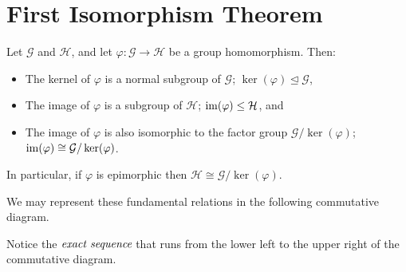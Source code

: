 
\section{First Isomorphism Theorem} %
\label{sec:firstisomorphismtheorem}

\begin{thm}
Let $\mathcal{G}$ and $\mathcal{H}$, and let
$\varphi : \mathcal{G} \to \mathcal{H}$ be a group homomorphism.
Then:
\begin{itemize}
	\item The kernel of $\varphi$ is a normal subgroup of $\mathcal{G}$;
		$\ker(\varphi) \unlhd \mathcal{G}$,
	\item The image of $\varphi$ is a subgroup of $\mathcal{H}$;
		$\operatorname{im}(\varphi) \leq \mathcal{H}$, and
	\item The image of $\varphi$ is also isomorphic to the factor group
		$\mathcal{G} / \ker(\varphi)$;
		$\operatorname{im}(\varphi) \cong \mathcal{G} / \ker(\varphi)$.
\end{itemize}
In particular, if $\varphi$ is epimorphic then
$\mathcal{H} \cong \mathcal{G} / \ker(\varphi)$.
\end{thm}

We may represent these fundamental relations in the following commutative diagram.


Notice the $\emph{exact sequence}$ that runs from the lower left to the upper right of the commutative diagram.
